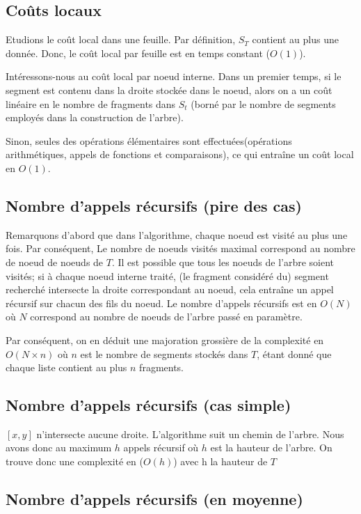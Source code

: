 \subsection{Coûts locaux}
Etudions le coût local dans une feuille.
Par définition, $S_T$ contient au plus une donnée.
Donc, le coût local par feuille est en temps constant ($O(1)$).

Intéressons-nous au coût local par noeud interne.
Dans un premier temps, si le segment est contenu dans
la droite stockée dans le noeud, alors on a un coût linéaire
en le nombre de fragments dans $S_t$ (borné par le nombre de
segments employés dans la construction de l'arbre).

Sinon, seules des opérations élémentaires sont
effectuées(opérations arithmétiques, appels de fonctions
et comparaisons), ce qui entraîne un coût local en $O(1)$.

\subsection{Nombre d'appels récursifs (pire des cas)}
Remarquons d'abord que dans l'algorithme, chaque noeud est
visité au plus une fois.
Par conséquent, Le nombre de noeuds visités maximal correspond
au nombre de noeud de noeuds de $T$.
Il est possible que tous les noeuds de l'arbre soient visités;
si à chaque noeud interne traité, (le fragment considéré du) segment
recherché intersecte la droite correspondant au noeud, cela entraîne
un appel récursif sur chacun des fils du noeud.
Le nombre d'appels récursifs est en $O(N)$ où $N$ correspond
au nombre de noeuds de l'arbre passé en paramètre.

Par conséquent, on en déduit une majoration grossière de
la complexité en $O(N \times n)$ où $n$ est le nombre de
segments stockés dans $T$, étant donné que chaque liste contient
au plus $n$ fragments.

\subsection{Nombre d'appels récursifs (cas simple)}
$[x,y]$ n'intersecte aucune droite.
L'algorithme suit un chemin de l'arbre. Nous avons donc
au maximum $h$ appels récursif où $h$ est la hauteur de l'arbre.
On trouve donc une complexité en ($O(h)$) avec h la hauteur de $T$

\subsection{Nombre d'appels récursifs (en moyenne)}

